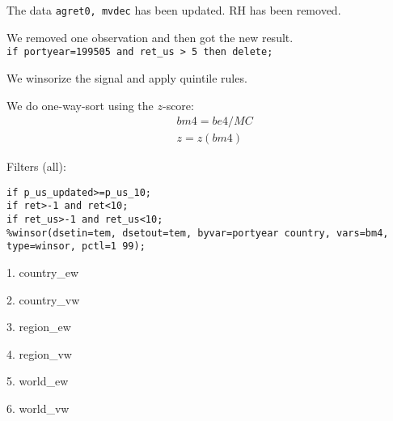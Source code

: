 

\usepackage[T1]{fontenc}




\thispagestyle{fancy}

\newcommand{\code}{\texttt}
\newcommand*{\Commonpath}{20190109/bm4-quintile}

The data \code{agret0, mvdec} has been updated. RH has been removed.

We removed one observation and then got the new result. \\
\code{if portyear=199505 and ret\_us > 5 then delete;}

We winsorize the signal and apply quintile rules.

We do one-way-sort using the $z$-score:
$$
\begin{aligned}
& bm4 = be4/MC \\
& z = z(bm4)
\end{aligned}
$$

Filters (all):

\code{if p\_us\_updated>=p\_us\_10;} \\
\code{if ret>-1 and ret<10;} \\
\code{if ret\_us>-1 and ret\_us<10;} \\
\code{\%winsor(dsetin=tem, dsetout=tem, byvar=portyear country, vars=bm4, type=winsor, pctl=1 99);} \\

\small

1. country\_ew


2. country\_vw


3. region\_ew


4. region\_vw


5. world\_ew


6. world\_vw




